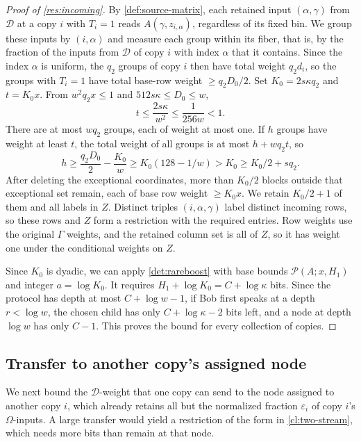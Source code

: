 \documentclass[11pt,letterpaper]{article} \usepackage[utf8]{inputenc}
\theoremstyle{plain} \newtheorem{theorem}{Theorem}[section]
\theoremstyle{definition} \newaliascnt{definition}{theorem}
\newcommand{\RP}[3]{\mathcal{P}(#1;#2,#3)}
\begin{document}
\begin{proof}[Proof of \cref{res:incoming}]
By \cref{def:source-matrix}, each retained input $(\alpha,\gamma)$ from $\mathcal D$ at a copy $i$ with $T_i=1$ reads
$A(\gamma,z_{i,\alpha})$, regardless of its fixed bin. We group these inputs by $(i,\alpha)$
and measure each group within its fiber, that is, by the fraction of the inputs
from $\mathcal D$ of copy $i$ with index $\alpha$ that it contains. Since the
index $\alpha$ is uniform, the $q_2$ groups of copy $i$ then have total weight $q_2d_i$,
so the groups with $T_i=1$ have total base-row weight $\ge q_2D_0/2$.
Set $K_0=2s\kappa q_2$ and $t=K_0x$. From $w^2q_2x\le1$ and $512s\kappa\le D_0\le w$,
\[
t\le\frac{2s\kappa}{w^2}\le\frac1{256w}<1.
\]
There are at most $wq_2$ groups, each of weight at most one. If $h$ groups have weight
at least $t$, the total weight of all groups is at most $h+wq_2t$, so
\[
h\ge\frac{q_2D_0}{2}-\frac{K_0}{w}
\ge K_0(128-1/w)>K_0\ge K_0/2+sq_2.
\]
After deleting the exceptional coordinates, more than $K_0/2$ blocks outside that exceptional set
remain, each of base row weight $\ge K_0x$. We retain $K_0/2+1$ of them and
all labels in $Z$. Distinct triples $(i,\alpha,\gamma)$ label distinct incoming
rows, so these rows and $Z$ form a restriction with the required entries. Row weights use the original $\Gamma$ weights, and the
retained column set is all of $Z$, so it has weight one under the conditional weights on $Z$.

Since $K_0$ is dyadic, we can apply \cref{det:rareboost} with base bounds
$\RP{A}{x}{H_1}$ and integer $a=\log K_0$.
It requires $H_1+\log K_0=C+\log\kappa$ bits.
Since the protocol has depth at most $C+\log w-1$, if Bob first speaks at a depth $r<\log w$, the chosen child has only $C+\log\kappa-2$ bits left, and a node at depth $\log w$
has only $C-1$. This proves the bound for every collection of copies.
\end{proof}

\subsection{Transfer to another copy's assigned node}
\label{sec:foreign-bound-proof}

We next bound the $\mathcal D$-weight that one copy can send to the node assigned to
another copy $i$, which already retains all but the normalized fraction $\varepsilon_i$ of
copy $i$'s $\Omega$-inputs. A large transfer would yield a restriction
of the form in \cref{cl:two-stream}, which needs more bits than remain at that node.
\end{document}
